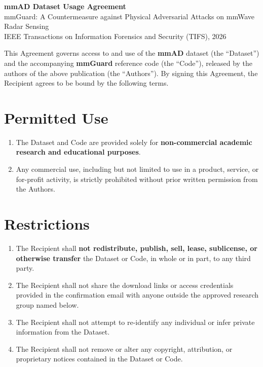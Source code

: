 \documentclass[11pt]{article}
\begin{document}
\begin{center}
{\LARGE\bfseries mmAD Dataset Usage Agreement}\\[0.4em]
{\large mmGuard: A Countermeasure against Physical Adversarial Attacks on mmWave Radar Sensing}\\[0.3em]
{\normalsize IEEE Transactions on Information Forensics and Security (TIFS), 2026}
\end{center}

\vspace{0.5em}

This Agreement governs access to and use of the \textbf{mmAD} dataset (the
``Dataset'') and the accompanying \textbf{mmGuard} reference code (the
``Code''), released by the authors of the above publication (the
``Authors''). By signing this Agreement, the Recipient agrees to be bound by
the following terms.

\section{Permitted Use}
\begin{enumerate}[label=\arabic*.]
  \item The Dataset and Code are provided solely for \textbf{non-commercial
        academic research and educational purposes}.
  \item Any commercial use, including but not limited to use in a product,
        service, or for-profit activity, is strictly prohibited without prior
        written permission from the Authors.
\end{enumerate}

\section{Restrictions}
\begin{enumerate}[label=\arabic*.]
  \item The Recipient shall \textbf{not redistribute, publish, sell, lease,
        sublicense, or otherwise transfer} the Dataset or Code, in whole or in
        part, to any third party.
  \item The Recipient shall not share the download links or access credentials
        provided in the confirmation email with anyone outside the approved
        research group named below.
  \item The Recipient shall not attempt to re-identify any individual or
        infer private information from the Dataset.
  \item The Recipient shall not remove or alter any copyright, attribution, or
        proprietary notices contained in the Dataset or Code.
\end{enumerate}
\end{document}
